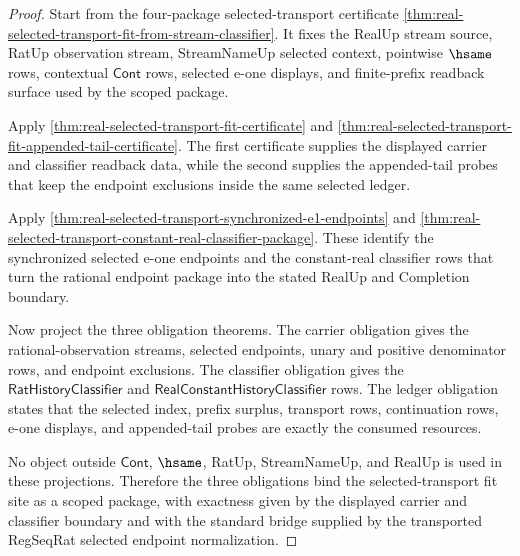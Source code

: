 \begin{proof}
Start from the four-package selected-transport certificate
\autoref{thm:real-selected-transport-fit-from-stream-classifier}. It fixes the
RealUp stream source, RatUp observation stream, StreamNameUp selected context,
pointwise $\hsame$ rows, contextual $\mathsf{Cont}$ rows, selected e-one
displays, and finite-prefix readback surface used by the scoped package.

Apply \autoref{thm:real-selected-transport-fit-certificate} and
\autoref{thm:real-selected-transport-fit-appended-tail-certificate}. The first
certificate supplies the displayed carrier and classifier readback data, while
the second supplies the appended-tail probes that keep the endpoint exclusions
inside the same selected ledger.

Apply \autoref{thm:real-selected-transport-synchronized-e1-endpoints} and
\autoref{thm:real-selected-transport-constant-real-classifier-package}. These
identify the synchronized selected e-one endpoints and the constant-real
classifier rows that turn the rational endpoint package into the stated RealUp
and Completion boundary.

Now project the three obligation theorems. The carrier obligation gives the
rational-observation streams, selected endpoints, unary and positive
denominator rows, and endpoint exclusions. The classifier obligation gives the
$\mathsf{RatHistoryClassifier}$ and
$\mathsf{RealConstantHistoryClassifier}$ rows. The ledger obligation states
that the selected index, prefix surplus, transport rows, continuation rows,
e-one displays, and appended-tail probes are exactly the consumed resources.

No object outside $\mathsf{Cont}$, $\hsame$, RatUp, StreamNameUp, and RealUp is
used in these projections. Therefore the three obligations bind the
selected-transport fit site as a scoped package, with exactness given by the
displayed carrier and classifier boundary and with the standard bridge supplied
by the transported RegSeqRat selected endpoint normalization.
\end{proof}
